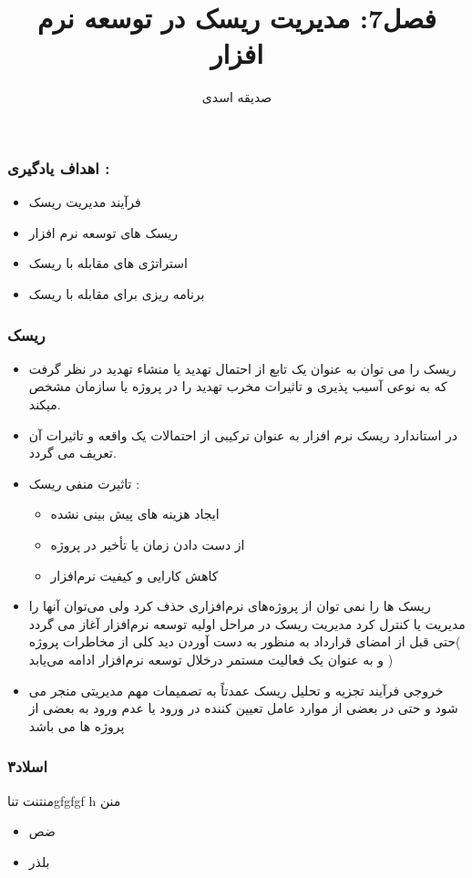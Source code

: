\documentclass[xcolor=dvipsnames,professionalfonts]{beamer}
\author{صديقه اسدی}
\title{فصل7:  مديريت ريسک در توسعه نرم افزار}
\institute{دانشگاه پیام نور واحد تهران شمال}
\begin{document}
	\frame{\maketitle}
	\begin{frame}
	
		\frametitle{اهداف یادگیری :}
      \begin{itemize}
     	\item    فرآیند مدیریت ریسک
     	\item    ریسک های توسعه نرم افزار   
     	\item    استراتژی های مقابله با ریسک
     	\item    برنامه ریزی برای مقابله با ریسک
     \end{itemize}
	\end{frame}
\begin{frame}
	
	\frametitle{ریسک}
	
	
	
	
	
	\begin{itemize}
	
	    	\item ریسک را می توان به عنوان یک تابع از احتمال تهدید یا منشاء تهدید در نظر گرفت  که به نوعی آسیب پذیری و تاثیرات مخرب تهدید را در پروژه یا سازمان مشخص میکند. 
	    	\item در استاندارد  ریسک نرم افزار به عنوان ترکیبی از احتمالات یک واقعه و تاثیرات آن تعریف می گردد.
	    	\item 
		تاثیرت منفی ریسک :
		\begin{itemize}
			\item ایجاد هزینه های پیش بینی نشده
			\item 		از دست دادن زمان یا تأخیر در پروژه
			\item 		کاهش کارایی و کیفیت نرم‌افزار 
		\end{itemize}
		
 

		\item ریسک ها را نمی توان از پروژه‌های نرم‌افزاری حذف کرد ولی می‌توان آنها را مدیریت یا کنترل کرد
		مدیریت ریسک در مراحل اولیه توسعه نرم‌افزار آغاز می گردد )حتی قبل از امضای قرارداد به منظور به دست آوردن دید کلی از مخاطرات پروژه ( و به عنوان یک فعالیت مستمر درخلال توسعه نرم‌افزار ادامه می‌یابد
		\item خروجی فرآیند تجزیه و تحلیل ریسک عمدتاً به تصمیمات مهم مدیریتی منجر می شود و حتی در بعضی از موارد عامل تعیین کننده در ورود یا عدم ورود به بعضی از پروژه ها می باشد
		
	\end{itemize}
\end{frame}
\begin{frame}
	\frametitle{اسلاد۳}
	منتنت تناgfgfgf h منن
	\begin{itemize}
		\item ضص
		\item بلذر
	\end{itemize}
\end{frame}
\end{document}
